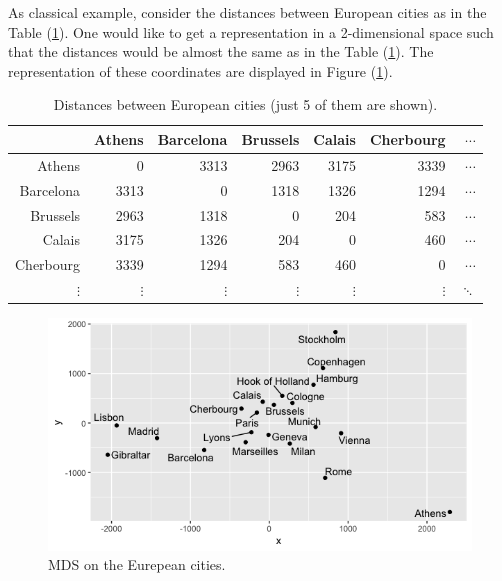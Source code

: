 \documentclass[11pt]{report}
\begin{document}
\indent As classical example, consider the distances between European cities as
in the Table (\ref{european_distances}). One would like to get a representation in
a 2-dimensional space such that the distances would be almost the same as in the 
Table (\ref{european_distances}). The representation of these coordinates are 
displayed in Figure (\ref{europ_cities}).

\begin{table}[ht]
\centering
\begin{tabular}{rrrrrrr}
  \hline
 & Athens & Barcelona & Brussels & Calais & Cherbourg & $\dotsi$ \\ 
  \hline
Athens & 0 & 3313 & 2963 & 3175 & 3339 & $\dotsi$ \\ 
  Barcelona & 3313 & 0& 1318 & 1326 & 1294 & $\dotsi$ \\ 
  Brussels & 2963 & 1318 & 0 & 204 & 583 & $\dotsi$ \\ 
  Calais & 3175 & 1326 & 204 & 0 & 460 & $\dotsi$ \\ 
  Cherbourg & 3339 & 1294 & 583 & 460 & 0 & $\dotsi$ \\
  $\vdots$ & $\vdots$ & $\vdots$ & $\vdots$ & $\vdots$ & $\vdots$ & $\ddots$ \\
   \hline
\end{tabular}
\caption{Distances between European cities (just 5 of them are shown).} 
\label{european_distances}
\end{table}


\begin{figure}[ht]
\centering
    \includegraphics[scale = 0.5]{./images/europ_cities.png}
    \caption{MDS on the Eurepean cities.}
    \label{europ_cities}
\end{figure}

\end{document}
